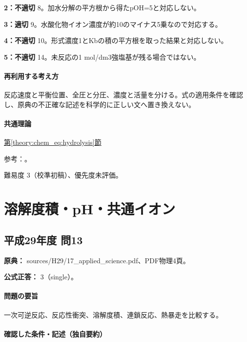 \noindent\textbf{2：不適切} 8。加水分解の平方根から得たpOH=\allowbreak{}5と対応しない。\par

\noindent\textbf{3：適切} 9。水酸化物イオン濃度が約10のマイナス5乗なので対応する。\par

\noindent\textbf{4：不適切} 10。形式濃度1とKbの積の平方根を取った結果と対応しない。\par

\noindent\textbf{5：不適切} 14。未反応の1 mol/dm3強塩基が残る場合ではない。\par

\paragraph{再利用する考え方} 反応速度と平衡位置、全圧と分圧、濃度と活量を分ける。式の適用条件を確認し、原典の不正確な記述を科学的に正しい文へ置き換えない。

\paragraph{共通理論} \hyperref[theory:chem_eq:hydrolysis]{第\ref*{theory:chem_eq:hydrolysis}節}

\par 参考：\cite{iupac_greenbook2012,mit_buffer2008}。

\par 難易度 3（校準初稿）、優先度未評価。

\section{溶解度積・pH・共通イオン}

\subsection{平成29年度 問13}
\label{q:h29-reg-applied-13}

\noindent\textbf{原典：} sources/H29/17\_applied\_science.pdf、PDF物理4頁。

\textbf{公式正答：} 3（single）。

\paragraph{問題の要旨} 一次可逆反応、反応性衝突、溶解度積、連鎖反応、熱暴走を比較する。

\paragraph{確認した条件・記述（独自要約）}\mbox{}\par

